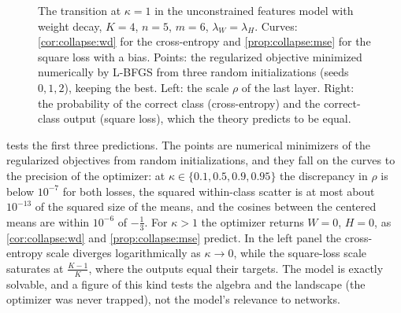 \begin{refsection}
\begin{figure}[t]
\begin{fullwidth}
\centering
{}
\caption{The transition at $\kappa=1$ in the unconstrained features model with weight decay, $K=4$, $n=5$, $m=6$, $\lambda_W=\lambda_H$. Curves: \cref{cor:collapse:wd} for the cross-entropy and \cref{prop:collapse:mse} for the square loss with a bias. Points: the regularized objective minimized numerically by L-BFGS from three random initializations (seeds $0,1,2$), keeping the best. Left: the scale $\rho$ of the last layer. Right: the probability of the correct class (cross-entropy) and the correct-class output (square loss), which the theory predicts to be equal.}\label{fig:collapse:phase}
\end{fullwidth}
\end{figure}

 tests the first three predictions. The points are numerical minimizers of the regularized objectives from random initializations, and they fall on the curves to the precision of the optimizer: at $\kappa\in\{0.1,0.5,0.9,0.95\}$ the discrepancy in $\rho$ is below $10^{-7}$ for both losses, the squared within-class scatter is at most about $10^{-13}$ of the squared size of the means, and the cosines between the centered means are within $10^{-6}$ of $-\frac13$. For $\kappa>1$ the optimizer returns $W=0$, $H=0$, as \cref{cor:collapse:wd} and \cref{prop:collapse:mse} predict. In the left panel the cross-entropy scale diverges logarithmically as $\kappa\to0$, while the square-loss scale saturates at $\frac{K-1}K$, where the outputs equal their targets. The model is exactly solvable, and a figure of this kind tests the algebra and the landscape (the optimizer was never trapped), not the model's relevance to networks.


\end{refsection}
